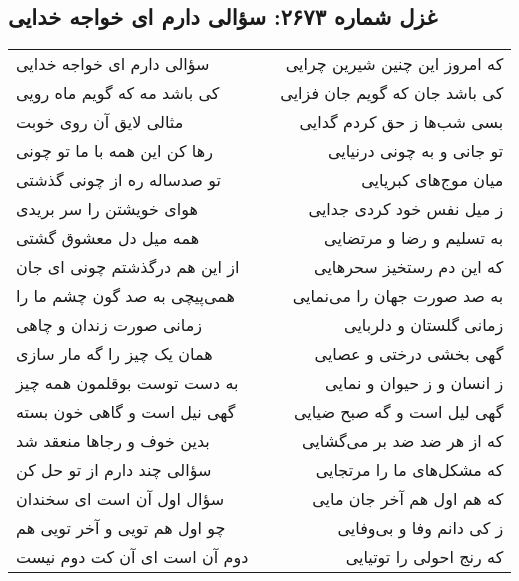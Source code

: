 \begin{center}
\section*{غزل شماره ۲۶۷۳: سؤالی دارم ای خواجه خدایی}
\label{sec:2673}
\begin{longtable}{l p{0.5cm} r}
سؤالی دارم ای خواجه خدایی
&&
که امروز این چنین شیرین چرایی
\\
کی باشد مه که گویم ماه رویی
&&
کی باشد جان که گویم جان فزایی
\\
مثالی لایق آن روی خوبت
&&
بسی شب‌ها ز حق کردم گدایی
\\
رها کن این همه با ما تو چونی
&&
تو جانی و به چونی درنیایی
\\
تو صدساله ره از چونی گذشتی
&&
میان موج‌های کبریایی
\\
هوای خویشتن را سر بریدی
&&
ز میل نفس خود کردی جدایی
\\
همه میل دل معشوق گشتی
&&
به تسلیم و رضا و مرتضایی
\\
از این هم درگذشتم چونی ای جان
&&
که این دم رستخیز سحرهایی
\\
همی‌پیچی به صد گون چشم ما را
&&
به صد صورت جهان را می‌نمایی
\\
زمانی صورت زندان و چاهی
&&
زمانی گلستان و دلربایی
\\
همان یک چیز را گه مار سازی
&&
گهی بخشی درختی و عصایی
\\
به دست توست بوقلمون همه چیز
&&
ز انسان و ز حیوان و نمایی
\\
گهی نیل است و گاهی خون بسته
&&
گهی لیل است و گه صبح ضیایی
\\
بدین خوف و رجاها منعقد شد
&&
که از هر ضد ضد بر می‌گشایی
\\
سؤالی چند دارم از تو حل کن
&&
که مشکل‌های ما را مرتجایی
\\
سؤال اول آن است ای سخندان
&&
که هم اول هم آخر جان مایی
\\
چو اول هم تویی و آخر تویی هم
&&
ز کی دانم وفا و بی‌وفایی
\\
دوم آن است ای آن کت دوم نیست
&&
که رنج احولی را توتیایی
\\
\end{longtable}
\end{center}
